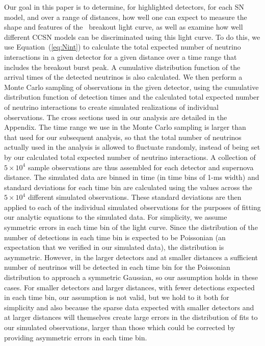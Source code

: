 Our goal in this paper is to determine, for highlighted detectors, 
for each SN
model, and over a range of distances, how well one can expect to measure 
the shape and features of the \nue\ breakout light curve, as well as
examine how well different CCSN models can be discriminated using this
light curve. To do this, we use
Equation~(\ref{eq:Nint}) to calculate the total expected number of
neutrino interactions in a given detector for a given distance over a
time range that includes 
the breakout burst peak.  A cumulative distribution function of
the arrival times of the detected neutrinos is also calculated.  We
then perform a Monte Carlo sampling of observations in the given
detector, using the cumulative distribution function of detection
times and the calculated total expected number of neutrino
interactions to create simulated realizations of individual
observations.  
The cross sections used in our analysis are detailed in
the Appendix.
The time range we use in the Monte Carlo sampling is
larger than that used for our subsequent analysis, so that the total
number of neutrinos actually used in the analysis is allowed to
fluctuate randomly, instead of being set by our calculated total expected
number of neutrino interactions.   A collection of $5\times10^4$ 
sample observations are thus assembled for each detector and supernova
distance.  The simulated data
are binned in time (in time bins of 1-ms width) 
and standard deviations for each time bin are
calculated using the values across the $5\times10^4$ different
simulated observations.
These standard deviations are then applied to each of the individual simulated
observations for the purposes of fitting our analytic equations to the
simulated data.  For simplicity, we assume symmetric errors in each
time bin of the light curve.  Since the distribution of the number 
of detections in
each time bin is expected to be Poissonian (an expectation that we
verified in our simulated data), the distribution is asymmetric.  
However, in the larger detectors
and at smaller distances a sufficient number of neutrinos will be
detected in each time bin for the Poissonian distribution to approach a
symmetric Gaussian, so our assumption holds in these cases.  For
smaller detectors and larger distances, with fewer detections expected
in each time bin, our assumption is not valid, but we hold to it both
for simplicity and also because the sparse data expected with smaller
detectors and at larger distances will themselves create large errors in the
distribution of fits to our simulated observations, larger than those
which could be corrected by providing asymmetric errors in each time bin.

